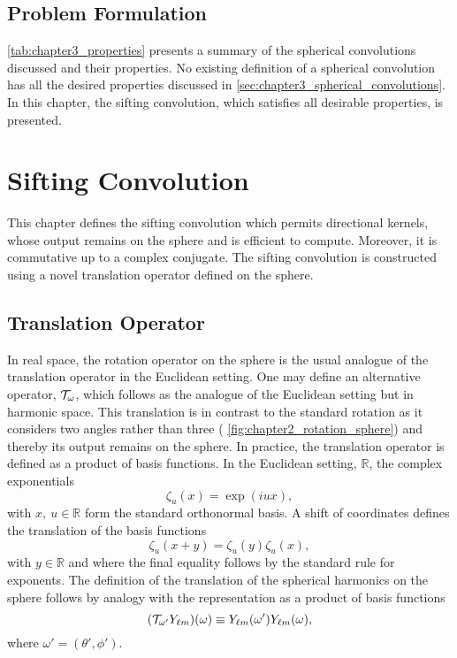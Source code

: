 \subsection{Problem Formulation}

\cref{tab:chapter3_properties} presents a summary of the spherical convolutions discussed and their properties.
No existing definition of a spherical convolution has all the desired properties discussed in \cref{sec:chapter3_spherical_convolutions}.
In this chapter, the sifting convolution, which satisfies all desirable properties, is presented.



\section{Sifting Convolution}\label{sec:chapter3_sifting_convolution}

This chapter defines the sifting convolution which permits directional kernels, whose output remains on the sphere and is efficient to compute.
Moreover, it is commutative up to a complex conjugate.
The sifting convolution is constructed using a novel translation operator defined on the sphere.

\subsection{Translation Operator}\label{sec:chapter3_translation_operator}

In real space, the rotation operator on the sphere is the usual analogue of the translation operator in the Euclidean setting.
One may define an alternative operator, \(\translation{\omega}\), which follows as the analogue of the Euclidean setting but in harmonic space.
This translation is in contrast to the standard rotation as it considers two angles rather than three (\cf{} \cref{fig:chapter2_rotation_sphere}) and thereby its output remains on the sphere.
In practice, the translation operator is defined as a product of basis functions.
In the Euclidean setting, \eg{} \(\mathbb{R}\), the complex exponentials
%
\begin{equation}\label{eq:chapter3_complex_exponentials}
	\zeta_{u}(x)
	= \exp(i u x),
\end{equation}
%
with \(x,\ u \in \mathbb{R}\) form the standard orthonormal basis.
A shift of coordinates defines the translation of the basis functions
%
\begin{equation}\label{eq:chapter3_exponentials_shift}
	\zeta_{u}(x + y)
	= \zeta_{u}(y) \zeta_{u}(x),
\end{equation}
%
with \(y \in \mathbb{R}\) and where the final equality follows by the standard rule for exponents.
The definition of the translation of the spherical harmonics on the sphere follows by analogy with the representation as a product of basis functions
%
\begin{equation}\label{eq:chapter3_translation_basis_functions}
	\pixel{(\translation{\omega'}\harmonic{Y})}
	\equiv \pixel[']{\harmonic{Y}} \pixel{\harmonic{Y}},
\end{equation}
%
where \(\omega'=(\theta',\phi')\).

